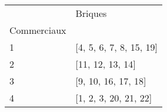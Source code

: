 \documentclass[preview]{standalone}
\begin{document}
    \begin{tabular}{ll}
\toprule
 & Briques \\
Commerciaux &  \\
\midrule
1 & [4, 5, 6, 7, 8, 15, 19] \\
2 & [11, 12, 13, 14] \\
3 & [9, 10, 16, 17, 18] \\
4 & [1, 2, 3, 20, 21, 22] \\
\bottomrule
\end{tabular}

    
\end{document}
